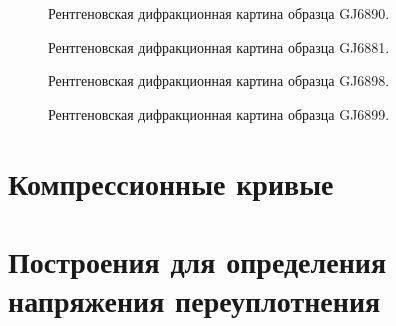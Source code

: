   \begin{figure}[ht]
    \caption{Рентгеновская дифракционная картина образца GJ6890.}\label{fig:fig}
  \end{figure}

  \begin{figure}[ht]
    \caption{Рентгеновская дифракционная картина образца GJ6881.}\label{fig:fig}
  \end{figure}

  \begin{figure}[ht]
    \caption{Рентгеновская дифракционная картина образца GJ6898.}\label{fig:fig}
  \end{figure}

  \begin{figure}[ht]
    \caption{Рентгеновская дифракционная картина образца GJ6899.}\label{fig:fig}
  \end{figure}

  \chapter{Компрессионные кривые}\label{app:oedometer}
  

  \chapter{Построения для определения напряжения переуплотнения}\label{app:method}
  